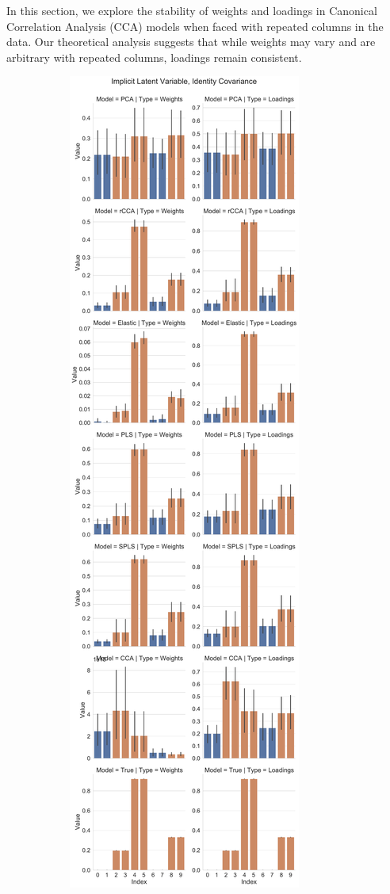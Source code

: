 In this section, we explore the stability of weights and loadings in Canonical Correlation Analysis (CCA) models when faced with repeated columns in the data.
Our theoretical analysis suggests that while weights may vary and are arbitrary with repeated columns, loadings remain consistent.

\begin{figure}
\centering
\begin{subfigure}{0.49\linewidth}
\centering
\includegraphics[width=\linewidth]{figures/simulated/repeated/Combined_Weights_Loadings_with_Error_Bars_Identity_Covariance_implicit}

\end{subfigure}
\end{figure}
